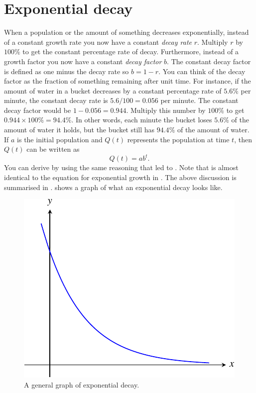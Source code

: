 \documentclass[a4paper,oneside,12pt]{article}
\begin{document}

\section{Exponential decay}

When a population or the amount of something decreases exponentially,
instead of a constant growth rate you now have a constant
\emph{decay rate} $r$.  Multiply $r$ by $100\%$ to get the constant
percentage rate of decay.  Furthermore, instead of a growth factor you
now have a constant \emph{decay factor} $b$.  The constant decay
factor is defined as one minus the decay rate so $b = 1 - r$.  You can
think of the decay factor as the fraction of something remaining after
unit time.  For instance, if the amount of water in a bucket decreases
by a constant percentage rate of $5.6\%$ per minute, the constant
decay rate is $5.6 / 100 = 0.056$ per minute.  The constant decay
factor would be $1 - 0.056 = 0.944$.  Multiply this number by $100\%$
to get $0.944 \times 100\% = 94.4\%$.  In other words, each minute the
bucket loses $5.6\%$ of the amount of water it holds, but the bucket
still has $94.4\%$ of the amount of water.  If $a$ is the initial
population and $Q(t)$ represents the population at time $t$, then
$Q(t)$ can be written as
\begin{equation}
\label{eqn:exponential_decay}
Q(t)
=
ab^t.
\end{equation}
You can derive  by using the same
reasoning that led to .  Note that
 is almost identical to the equation
for exponential growth in .  The above
discussion is summarised in .
 shows a graph of what an exponential
decay looks like.

\begin{figure}[!htbp]
\centering
\includegraphics[scale=1.1]{image/11/exponential-decay.pdf}
\caption{%
  A general graph of exponential decay.
}
\label{fig:exponential_decay}
\end{figure}
\end{document}
